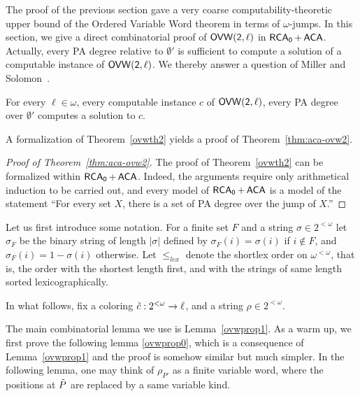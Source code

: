 
The proof of the previous section gave a very coarse computability-theoretic upper bound of the Ordered Variable Word theorem in terms of $\omega$-jumps. In this section, we give a direct combinatorial proof of $\sf{OVW}(2,\ell)$ in $\operatorname{\sf{RCA}_0} + \operatorname{\sf{ACA}}$. Actually, every PA degree relative to $\emptyset'$ is sufficient to compute a solution of a computable instance of $\sf{OVW}(2,\ell)$.
	We thereby answer a question of Miller and Solomon~\cite{Miller2004Effectiveness}.

\begin{theorem}\label{ovwth2}
For every $\ell \in\omega$,
every computable instance $c$ of $\sf{OVW}(2,\ell)$,
every PA degree over $\emptyset'$ computes a solution to $c$.
\end{theorem}

A formalization of Theorem~\ref{ovwth2} yields
a proof of Theorem~\ref{thm:aca-ovw2}.

\begin{proof}[Proof of Theorem~\ref{thm:aca-ovw2}]
The proof of Theorem~\ref{ovwth2} can be
formalized within $\operatorname{\sf{RCA}_0} + \operatorname{\sf{ACA}}$. Indeed, the arguments require only arithmetical induction to be carried out, and
every model of $\operatorname{\sf{RCA}_0} + \operatorname{\sf{ACA}}$ is a model of
the statement ``For every set $X$, there is a set of PA degree over the jump of $X$.''
\end{proof}

Let us first introduce some notation.
For a finite set $F$ and a string $\sigma \in 2^{<\omega}$
let $\sigma_F$ be the binary string of length $|\sigma|$
defined by $\sigma_F(i) = \sigma(i)$ if $i \not \in F$, and $\sigma_F(i) = 1-\sigma(i)$ otherwise. Let $\leq_{lex}$ denote the shortlex order
on  $\omega^{<\omega}$, that is, the order with the shortest length first, and with the strings of same length sorted lexicographically.

In what follows, fix a coloring $\tilde{c}:2^{<\omega}\rightarrow \ell$,
and a string $\rho\in 2^{<\omega}$.

The main combinatorial lemma we use is
 Lemma~\ref{ovwprop1}.
As a warm up, we first prove the following
lemma \ref{ovwprop0}, which is a consequence of Lemma~\ref{ovwprop1}
and the proof is somehow similar but
much simpler. In the following lemma, one may think of $\rho_{P'}$ as a finite variable word, where the positions at $\tilde{P}$ are replaced by a same variable kind.


